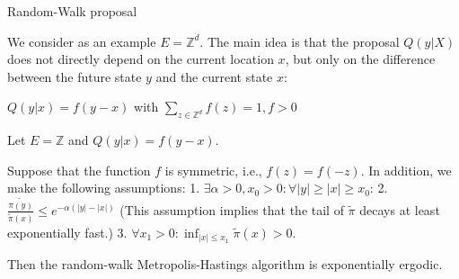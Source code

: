 Random-Walk proposal

We consider as an example \(E = \mathbb{Z}^d\).
The main idea is that the proposal \(Q(y|X)\) does not directly depend on the current location \(x\), but only on the difference 
between the future state \(y\) and the current state \(x\):

\( Q(y|x) = f(y - x) \) with \(\sum_{z \in \mathbb{Z}^d} f(z) = 1, f > 0\)

Let \(E = \mathbb{Z}\) and \(Q(y|x) = f(y - x)\).

Suppose that the function \(f\) is symmetric, i.e., \(f(z) = f(-z)\).
In addition, we make the following assumptions:
1. \( \exists \alpha > 0, x_0 > 0: \forall |y| \geq |x| \geq x_0 \):
2. \(\frac{\tilde{\pi(y)}}{\tilde{\pi}(x)} \leq e^{-\alpha(|y| - |x|)}\)
(This assumption implies that the tail of \(\tilde{\pi}\) decays at least exponentially fast.)
3. \( \forall x_1 > 0: \inf_{|x| \leq x_1} \tilde{\pi}(x) > 0 \).

Then the random-walk Metropolis-Hastings algorithm is exponentially ergodic.
